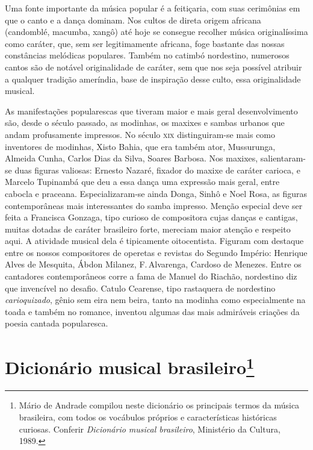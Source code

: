 Uma fonte importante da música popular é a feitiçaria, com suas
cerimônias em que o canto e a dança dominam. Nos cultos de direta origem
africana (candomblé, macumba, xangô) até hoje se consegue recolher
música originalíssima como caráter, que, sem ser legitimamente africana,
foge bastante das nossas constâncias melódicas populares. Também no
catimbó nordestino, numerosos cantos são de notável originalidade de
caráter, sem que nos seja possível atribuir a qualquer tradição
ameríndia, base de inspiração desse culto, essa originalidade musical.

As manifestações popularescas que tiveram maior e mais geral
desenvolvimento são, desde o século passado, as modinhas, os maxixes e
sambas urbanos que andam profusamente impressos. No século \textsc{xix}
distinguiram-se mais como inventores de modinhas, Xisto Bahia, que era
também ator, Mussurunga, Almeida Cunha, Carlos Dias da Silva, Soares
Barbosa. Nos maxixes, salientaram-se duas figuras valiosas: Ernesto
Nazaré, fixador do maxixe de caráter carioca, e Marcelo Tupinambá que
deu a essa dança uma expressão mais geral, entre cabocla e praceana.
Especializaram-se ainda Donga, Sinhô e Noel Rosa, as figuras
contemporâneas mais interessantes do samba impresso. Menção especial
deve ser feita a Francisca Gonzaga, tipo curioso de compositora cujas
danças e cantigas, muitas dotadas de caráter brasileiro forte, mereciam
maior atenção e respeito aqui. A atividade musical dela é tipicamente
oitocentista. Figuram com destaque entre os nossos compositores de
operetas e revistas do Segundo Império: Henrique Alves de Mesquita,
Ábdon Milanez, F.\,Alvarenga, Cardoso de Menezes. Entre os cantadores
contemporâneos corre a fama de Manuel do Riachão, nordestino diz que
invencível no desafio. Catulo Cearense, tipo rastaquera de nordestino
\textit{carioquizado}, gênio sem eira nem beira, tanto na modinha como
especialmente na toada e também no romance, inventou algumas das mais
admiráveis criações da poesia cantada popularesca.



\chapter{Dicionário musical brasileiro\footnote{Mário de Andrade compilou neste dicionário os principais termos da música brasileira, com todos os vocábulos próprios e características históricas curiosas. Conferir \textit{Dicionário musical brasileiro}, Ministério da Cultura, 1989.}}

